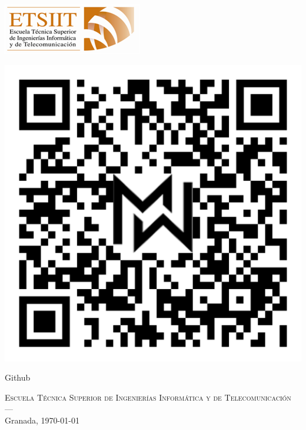\begin{titlepage}
\begin{minipage}{\textwidth}
\begin{center}
\hspace{-3em}
  \begin{minipage}{0.25\textwidth}
    \centering
    \includegraphics[width=\linewidth]{imagenes/etsiit_logo.png}
  \end{minipage}
  \hspace{1em}
  \vline
  \hspace{3em}
  \begin{minipage}{0.1\textwidth}
    \centering
    \begin{minipage}{1\textwidth}
        \includegraphics[width=\linewidth]{imagenes/QRGithub.png}
    \end{minipage}%
    \begin{minipage}{1\textwidth}
        Github
    \end{minipage}
  \end{minipage}
\end{center}

\textsc{Escuela Técnica Superior de Ingenierías Informática y de Telecomunicación}\\
\textsc{---}\\
Granada, \today
\end{minipage}
\end{titlepage}